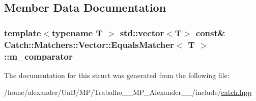 \subsection{Member Data Documentation}
\hypertarget{structCatch_1_1Matchers_1_1Vector_1_1EqualsMatcher_a56f7aa6f110a12b1b9aeb0cabbc9d755}{
\subsubsection[{m\-\_\-comparator}]{\setlength{\rightskip}{0pt plus 5cm}template$<$typename T $>$ std\-::vector$<$T$>$ const\& {\bf Catch\-::\-Matchers\-::\-Vector\-::\-Equals\-Matcher}$<$ T $>$\-::m\-\_\-comparator}}\label{structCatch_1_1Matchers_1_1Vector_1_1EqualsMatcher_a56f7aa6f110a12b1b9aeb0cabbc9d755}


The documentation for this struct was generated from the following file\-:\begin{DoxyCompactItemize}
\item 
/home/alexander/\-Un\-B/\-M\-P/\-Trabalho\-\_\-\_\-\-M\-P\-\_\-\-Alexander\-\_\-\_/include/\hyperlink{catch_8hpp}{catch.\-hpp}\end{DoxyCompactItemize}
